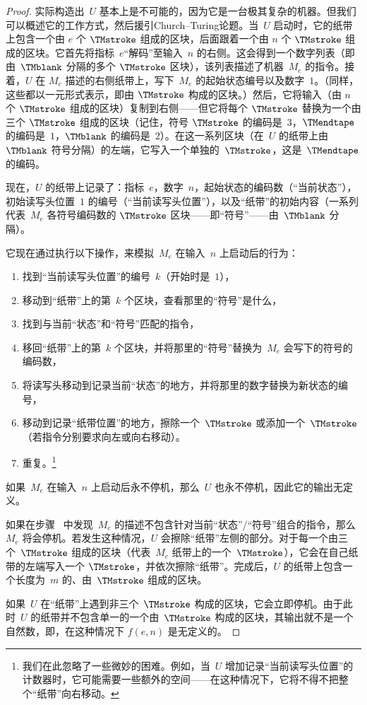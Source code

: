 \documentclass[../../../include/open-logic-section]{subfiles}
\begin{document}
\begin{proof}
  实际构造出~$U$ 基本上是不可能的，因为它是一台极其复杂的机器。但我们可以概述它的工作方式，然后援引Church--Turing论题。当~$U$ 启动时，它的纸带上包含一个由 $e$ 个 $\TMstroke$ 组成的区块，后面跟着一个由 $n$ 个 $\TMstroke$ 组成的区块。它首先将指标~$e$“解码”至输入~$n$ 的右侧。这会得到一个数字列表（即由~$\TMblank$ 分隔的多个 $\TMstroke$ 区块），该列表描述了机器~$M_e$ 的指令。接着，$U$ 在 $M_e$ 描述的右侧纸带上，写下~$M_e$ 的起始状态编号以及数字~$1$。（同样，这些都以一元形式表示，即由 $\TMstroke$ 构成的区块。）然后，它将输入（由 $n$ 个 $\TMstroke$ 组成的区块）复制到右侧——但它将每个 $\TMstroke$ 替换为一个由三个 $\TMstroke$ 组成的区块（记住，符号 $\TMstroke$ 的编码是~$3$，$\TMendtape$ 的编码是~$1$，$\TMblank$ 的编码是~$2$）。在这一系列区块（在~$U$ 的纸带上由 $\TMblank$ 符号分隔）的左端，它写入一个单独的~$\TMstroke$，这是~$\TMendtape$ 的编码。

  现在，$U$ 的纸带上记录了：指标~$e$，数字~$n$，起始状态的编码数（“当前状态”），初始读写头位置~$1$ 的编号（“当前读写头位置”），以及“纸带”的初始内容（一系列代表~$M_e$ 各符号编码数的 $\TMstroke$ 区块——即“符号”——由~$\TMblank$ 分隔）。

  它现在通过执行以下操作，来模拟~$M_e$ 在输入~$n$ 上启动后的行为：
  \begin{enumerate}
    \item 找到“当前读写头位置”的编号~$k$（开始时是~$1$），
    \item 移动到“纸带”上的第~$k$ 个区块，查看那里的“符号”是什么，
    \item{}%
    找到与当前“状态”和“符号”匹配的指令，
    \item 移回“纸带”上的第~$k$ 个区块，并将那里的“符号”替换为~$M_e$ 会写下的符号的编码数，
    \item 将读写头移动到记录当前“状态”的地方，并将那里的数字替换为新状态的编号，
    \item 移动到记录“纸带位置”的地方，擦除一个~$\TMstroke$ 或添加一个~$\TMstroke$（若指令分别要求向左或向右移动）。
    \item 重复。\footnote{我们在此忽略了一些微妙的困难。例如，当~$U$ 增加记录“当前读写头位置”的计数器时，它可能需要一些额外的空间——在这种情况下，它将不得不把整个“纸带”向右移动。}
  \end{enumerate}
  如果~$M_e$ 在输入~$n$ 上启动后永不停机，那么~$U$ 也永不停机，因此它的输出无定义。

  如果在步骤~ 中发现~$M_e$ 的描述不包含针对当前“状态”/“符号”组合的指令，那么~$M_e$ 将会停机。若发生这种情况，$U$ 会擦除“纸带”左侧的部分。对于每一个由三个~$\TMstroke$ 组成的区块（代表~$M_e$ 纸带上的一个~$\TMstroke$），它会在自己纸带的左端写入一个 $\TMstroke$，并依次擦除“纸带”。完成后，$U$ 的纸带上包含一个长度为~$m$ 的、由~$\TMstroke$ 组成的区块。

  如果~$U$ 在“纸带”上遇到非三个~$\TMstroke$ 构成的区块，它会立即停机。由于此时~$U$ 的纸带并不包含单一的一个由~$\TMstroke$ 构成的区块，其输出就不是一个自然数，即，在这种情况下 $f(e,n)$ 是无定义的。
\end{proof}
\end{document}
